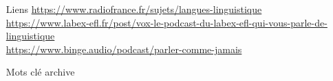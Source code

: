 \documentclass{book}
\begin{document}
\begin{enumerate}
\begin{itemize}
    \item [Liens]
        \url{https://www.radiofrance.fr/sujets/langues-linguistique}\\
        \url{https://www.labex-efl.fr/post/vox-le-podcast-du-labex-efl-qui-vous-parle-de-linguistique}\\
        \url{https://www.binge.audio/podcast/parler-comme-jamais}\\
    \item [Mots clé]
        \gls{archive}
\end{itemize}


 

\end{enumerate}



\begin{comment}
\chapter*{Acteurs (à répartir dans les différentes parties)}
\section{Nakala} 
\section{ORTOLANG}
\section{OPIDoR}
\section{CNRS}
\section{Recherche Data Gouv}
\section{DARIAH}
\section{CLARIN
}
\end{comment}

\printindex
\printnoidxglossaries
\printbibliography
\end{document}
